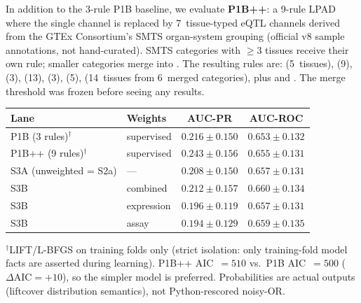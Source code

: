 \documentclass[11pt,openany]{report}
\begin{document}
In addition to the 3-rule P1B baseline, we evaluate \textbf{P1B++}:
a 9-rule LPAD where the single  channel is
replaced by 7~tissue-typed eQTL channels derived from the GTEx
Consortium's SMTS organ-system grouping (official v8 sample annotations,
not hand-curated).  SMTS categories with $\geq 3$ tissues receive their
own rule; smaller categories merge into .
The resulting rules are:
 (5~tissues),
 (9),
 (3),
 (13),
 (3),
 (5),
 (14~tissues from 6~merged categories),
plus  and .
The merge threshold was frozen before seeing any results.

\begin{center}
\small
\begin{tabular}{@{}llcc@{}}
\toprule
\textbf{Lane} & \textbf{Weights}
  & \textbf{AUC-PR} & \textbf{AUC-ROC} \\
\midrule
P1B (3 rules)$^\dagger$   & supervised & $0.216 \pm 0.150$ & $0.653 \pm 0.132$ \\
P1B++ (9 rules)$^\dagger$ & supervised & $0.243 \pm 0.156$ & $0.655 \pm 0.131$ \\
\midrule
S3A (unweighted = S2a) & ---        & $0.208 \pm 0.150$ & $0.657 \pm 0.131$ \\
S3B                    & combined   & $0.212 \pm 0.157$ & $0.660 \pm 0.134$ \\
S3B                    & expression & $0.196 \pm 0.119$ & $0.657 \pm 0.131$ \\
S3B                    & assay      & $0.194 \pm 0.129$ & $0.659 \pm 0.135$ \\
\bottomrule
\end{tabular}
\end{center}
\noindent
{\footnotesize $^\dagger$LIFT/L-BFGS on training folds only (strict
isolation: only training-fold model facts are asserted during learning).
P1B++ AIC~$=510$ vs.\ P1B AIC~$=500$ ($\Delta\text{AIC}=+10$),
so the simpler model is preferred.
Probabilities are actual  outputs (liftcover distribution
semantics), not Python-rescored noisy-OR.}
\end{document}
